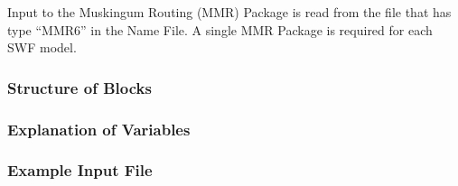 Input to the Muskingum Routing (MMR) Package is read from the file that has type ``MMR6'' in the Name File.  A single MMR Package is required for each SWF model. 

\vspace{5mm}
\subsubsection{Structure of Blocks}



\vspace{5mm}
\subsubsection{Explanation of Variables}
\begin{description}

\end{description}

\vspace{5mm}
\subsubsection{Example Input File}


